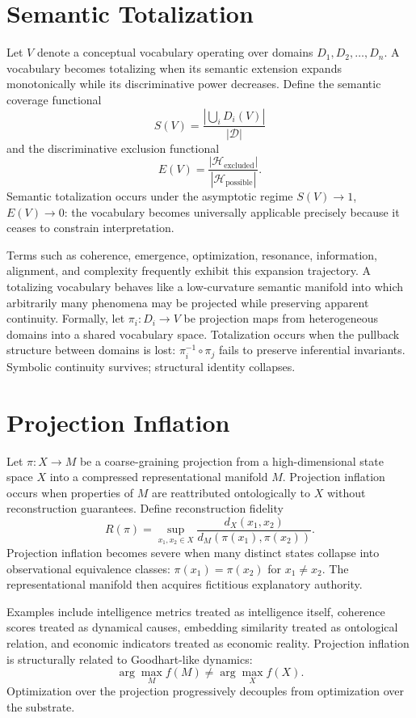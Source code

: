 \documentclass[12pt, openright, twoside]{book}
\begin{document}
\section{Semantic Totalization}

Let $V$ denote a conceptual vocabulary operating over domains
$D_1, D_2, \ldots, D_n$. A vocabulary becomes totalizing when its
semantic extension expands monotonically while its discriminative power
decreases. Define the semantic coverage functional
\[
S(V)
= \frac{|\bigcup_i D_i(V)|}{|\mathcal{D}|}
\]
and the discriminative exclusion functional
\[
E(V)
= \frac{|\mathcal{H}_{\mathrm{excluded}}|}{|\mathcal{H}_{\mathrm{possible}}|}.
\]
Semantic totalization occurs under the asymptotic regime
$S(V) \to 1$, $E(V) \to 0$: the vocabulary becomes universally applicable
precisely because it ceases to constrain interpretation.

Terms such as coherence, emergence, optimization, resonance, information,
alignment, and complexity frequently exhibit this expansion trajectory.
A totalizing vocabulary behaves like a low-curvature semantic manifold
into which arbitrarily many phenomena may be projected while preserving
apparent continuity. Formally, let $\pi_i : D_i \to V$ be projection maps
from heterogeneous domains into a shared vocabulary space. Totalization
occurs when the pullback structure between domains is lost:
$\pi_i^{-1} \circ \pi_j$ fails to preserve inferential invariants.
Symbolic continuity survives; structural identity collapses.

\section{Projection Inflation}

Let $\pi : X \to M$ be a coarse-graining projection from a high-dimensional
state space $X$ into a compressed representational manifold $M$. Projection
inflation occurs when properties of $M$ are reattributed ontologically to
$X$ without reconstruction guarantees. Define reconstruction fidelity
\[
R(\pi)
= \sup_{x_1, x_2 \in X}
  \frac{d_X(x_1, x_2)}{d_M(\pi(x_1), \pi(x_2))}.
\]
Projection inflation becomes severe when many distinct states collapse
into observational equivalence classes: $\pi(x_1) = \pi(x_2)$ for
$x_1 \neq x_2$. The representational manifold then acquires fictitious
explanatory authority.

Examples include intelligence metrics treated as intelligence itself,
coherence scores treated as dynamical causes, embedding similarity treated
as ontological relation, and economic indicators treated as economic
reality. Projection inflation is structurally related to Goodhart-like
dynamics:
\[
\arg\max_M f(M) \neq \arg\max_X f(X).
\]
Optimization over the projection progressively decouples from optimization
over the substrate.
\end{document}
